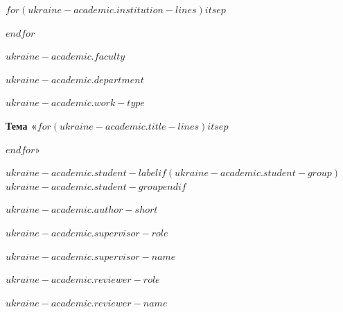\begin{titlepage}
\thispagestyle{empty}
\setlength{\parindent}{0pt}
\centering

{\bfseries\fontsize{14pt}{16.8pt}\selectfont
$for(ukraine-academic.institution-lines)$$it$$sep$\par $endfor$\par}

\vspace{0.8em}

{\fontsize{14pt}{16.8pt}\selectfont $ukraine-academic.faculty$\par}
{\fontsize{14pt}{16.8pt}\selectfont $ukraine-academic.department$\par}

\vspace{5.2em}

{\bfseries\fontsize{14pt}{16.8pt}\selectfont $ukraine-academic.work-type$\par}

\vspace{2.1em}

{\bfseries\fontsize{14pt}{16.8pt}\selectfont
Тема «$for(ukraine-academic.title-lines)$$it$$sep$\par $endfor$»\par}

\vspace{8.0em}

\noindent\begin{minipage}[t]{0.72\textwidth}
\fontsize{14pt}{16.8pt}\selectfont $ukraine-academic.student-label$$if(ukraine-academic.student-group)$ $ukraine-academic.student-group$$endif$
\end{minipage}%
\begin{minipage}[t]{0.28\textwidth}
\raggedright\fontsize{14pt}{16.8pt}\selectfont $ukraine-academic.author-short$
\end{minipage}

\noindent\begin{minipage}[t]{0.72\textwidth}
\fontsize{14pt}{16.8pt}\selectfont $ukraine-academic.supervisor-role$
\end{minipage}%
\begin{minipage}[t]{0.28\textwidth}
\raggedright\fontsize{14pt}{16.8pt}\selectfont $ukraine-academic.supervisor-name$
\end{minipage}

\noindent\begin{minipage}[t]{0.72\textwidth}
\fontsize{14pt}{16.8pt}\selectfont $ukraine-academic.reviewer-role$
\end{minipage}%
\begin{minipage}[t]{0.28\textwidth}
\raggedright\fontsize{14pt}{16.8pt}\selectfont $ukraine-academic.reviewer-name$
\end{minipage}


\end{titlepage}
